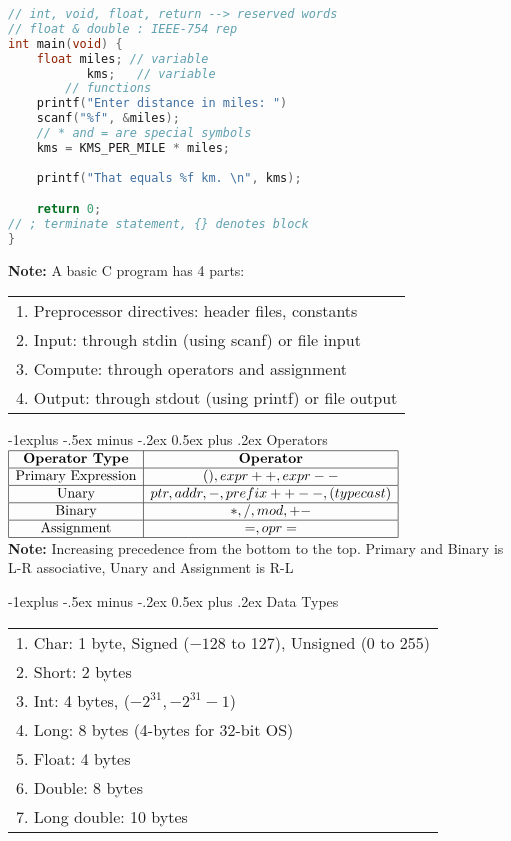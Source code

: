 \documentclass[10pt,landscape]{article}
\makeatletter
\renewcommand{\subsection}{\@startsection{subsection}{2}{0mm}%
                                {-1explus -.5ex minus -.2ex}%
                                {0.5ex plus .2ex}%
                                {\normalfont\normalsize\bfseries}}
\makeatother
\begin{document}
\begin{multicols}{3}
\begin{lstlisting}[language=C]
// int, void, float, return --> reserved words 
// float & double : IEEE-754 rep
int main(void) { 
	float miles; // variable
		   kms;   // variable 
        // functions
	printf("Enter distance in miles: ") 
	scanf("%f", &miles); 
	// * and = are special symbols
	kms = KMS_PER_MILE * miles; 
	
	printf("That equals %f km. \n", kms); 

	return 0; 
// ; terminate statement, {} denotes block 
} 
\end{lstlisting}
\textbf{Note:} A basic C program has 4 parts: \\ 
\begin{tabular}{l} 
1. Preprocessor directives: header files, constants \\ 
2. Input: through stdin (using scanf) or file input \\ 
3. Compute: through operators and assignment \\ 
4. Output: through stdout (using printf) or file output \\ 
\end{tabular}

\subsection{Operators} 
$\begin{array}{| c | c | c |}
    \hline\textbf{Operator Type} & \textbf{Operator} 
    
    \\\hline\text{Primary Expression} & (), expr++, expr-- 
            
    \\\hline\text{Unary} & ptr, addr, -, prefix ++ --, (typecast) 
            
    \\\hline\text{Binary} & *, /, mod, + - 
            
    \\\hline\text{Assignment} & =, opr=
        
    \\\hline
\end{array}$ \\ 
\textbf{Note:} Increasing precedence from the bottom to the top. Primary and Binary is L-R associative, Unary and Assignment is R-L

\subsection{Data Types} 
\begin{tabular}{l}
1. Char: 1 byte, Signed ($-128$ to 127), Unsigned (0 to 255) \\ 
2. Short: 2 bytes \\ 
3. Int: 4 bytes, ($-2^{31}, -2^{31} - 1$) \\ 
4. Long: 8 bytes (4-bytes for 32-bit OS) \\ 
5. Float: 4 bytes \\ 
6. Double: 8 bytes \\ 
7. Long double: 10 bytes \\ 
\end{tabular}


\end{multicols}
\end{document}
